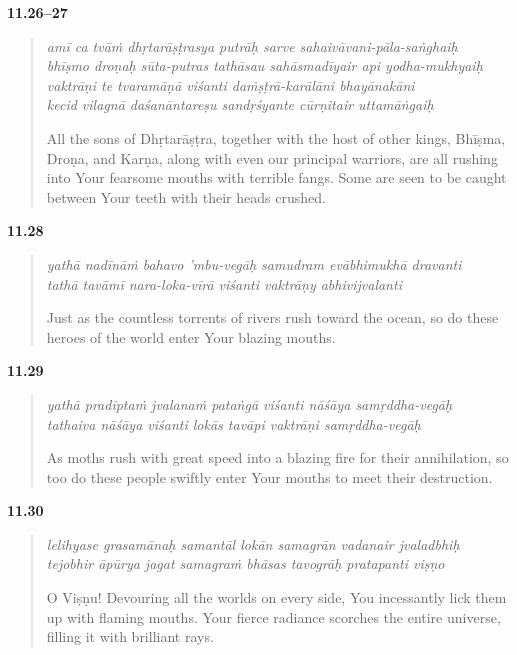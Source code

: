 \par\noindent\textbf{11.26–27}\par
\begin{verse}
\textit{amī ca tvāṁ dhṛtarāṣṭrasya putrāḥ sarve sahaivāvani-pāla-saṅghaiḥ} \\
\textit{bhīṣmo droṇaḥ sūta-putras tathāsau sahāsmadīyair api yodha-mukhyaiḥ} \\
\textit{vaktrāṇi te tvaramāṇā viśanti daṁṣṭrā-karālāni bhayānakāni} \\
\textit{kecid vilagnā daśanāntareṣu sandṛśyante cūrṇitair uttamāṅgaiḥ}

\noindent All the sons of Dhṛtarāṣṭra, together with the host of other kings, Bhīṣma, Droṇa, and Karṇa, along with even our principal warriors, are all rushing into Your fearsome mouths with terrible fangs. Some are seen to be caught between Your teeth with their heads crushed.
\end{verse}
\par



\par\noindent\textbf{11.28}\par
\begin{verse}
\textit{yathā nadīnāṁ bahavo ’mbu-vegāḥ samudram evābhimukhā dravanti} \\
\textit{tathā tavāmī nara-loka-vīrā viśanti vaktrāṇy abhivijvalanti}

\noindent Just as the countless torrents of rivers rush toward the ocean, so do these heroes of the world enter Your blazing mouths.
\end{verse}
\par



\par\noindent\textbf{11.29}\par
\begin{verse}
\textit{yathā pradīptaṁ jvalanaṁ pataṅgā viśanti nāśāya samṛddha-vegāḥ} \\
\textit{tathaiva nāśāya viśanti lokās tavāpi vaktrāṇi samṛddha-vegāḥ}

\noindent As moths rush with great speed into a blazing fire for their annihilation, so too do these people swiftly enter Your mouths to meet their destruction.
\end{verse}
\par



\par\noindent\textbf{11.30}\par
\begin{verse}
\textit{lelihyase grasamānaḥ samantāl lokān samagrān vadanair jvaladbhiḥ} \\
\textit{tejobhir āpūrya jagat samagraṁ bhāsas tavogrāḥ pratapanti viṣṇo}

\noindent O Viṣṇu! Devouring all the worlds on every side, You incessantly lick them up with flaming mouths. Your fierce radiance scorches the entire universe, filling it with brilliant rays.
\end{verse}
\par



